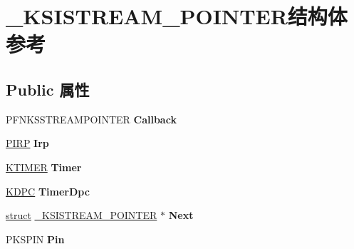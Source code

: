 \hypertarget{struct___k_s_i_s_t_r_e_a_m___p_o_i_n_t_e_r}{}\section{\+\_\+\+K\+S\+I\+S\+T\+R\+E\+A\+M\+\_\+\+P\+O\+I\+N\+T\+E\+R结构体 参考}
\label{struct___k_s_i_s_t_r_e_a_m___p_o_i_n_t_e_r}
\subsection*{Public 属性}
\begin{DoxyCompactItemize}
\item 
\mbox{\label{struct___k_s_i_s_t_r_e_a_m___p_o_i_n_t_e_r_a71de7642adee2755d76d21a688a366e5}} 
P\+F\+N\+K\+S\+S\+T\+R\+E\+A\+M\+P\+O\+I\+N\+T\+ER {\bfseries Callback}
\item 
\mbox{\label{struct___k_s_i_s_t_r_e_a_m___p_o_i_n_t_e_r_a457ba35e26f9cd57e31008aa98d75b7b}} 
\hyperlink{interfacevoid}{P\+I\+RP} {\bfseries Irp}
\item 
\mbox{\label{struct___k_s_i_s_t_r_e_a_m___p_o_i_n_t_e_r_aa8b9d7f8b0ecb6d54497754aa057e906}} 
\hyperlink{struct___k_t_i_m_e_r}{K\+T\+I\+M\+ER} {\bfseries Timer}
\item 
\mbox{\label{struct___k_s_i_s_t_r_e_a_m___p_o_i_n_t_e_r_a09e6a10821c4d61105c3aeb5a53b36fe}} 
\hyperlink{struct___k_d_p_c}{K\+D\+PC} {\bfseries Timer\+Dpc}
\item 
\mbox{\label{struct___k_s_i_s_t_r_e_a_m___p_o_i_n_t_e_r_a6941be1aaa15548f6e46d1a5706e11b3}} 
\hyperlink{interfacestruct}{struct} \hyperlink{struct___k_s_i_s_t_r_e_a_m___p_o_i_n_t_e_r}{\+\_\+\+K\+S\+I\+S\+T\+R\+E\+A\+M\+\_\+\+P\+O\+I\+N\+T\+ER} $\ast$ {\bfseries Next}
\item 
\mbox{\label{struct___k_s_i_s_t_r_e_a_m___p_o_i_n_t_e_r_a3e50e467fbd2935a72c450a00862787e}} 
P\+K\+S\+P\+IN {\bfseries Pin}
\item 

\end{DoxyCompactItemize}
